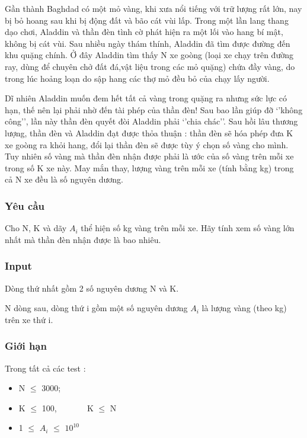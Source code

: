 

Gần thành Baghdad có một mỏ vàng, khi xưa nổi tiếng với trữ lượng rất lớn, nay bị bỏ hoang sau khi bị động đất và bão cát vùi lấp. Trong một lần lang thang dạo chơi, Aladdin và thần đèn tình cờ phát hiện ra một lối vào hang bí mật, không bị cát vùi. Sau nhiều ngày thám thính, Aladdin đã tìm được đường đến khu quặng chính. Ở đây Aladdin tìm thấy N xe goòng (loại xe chạy trên đường ray, dùng để chuyên chở đất đá,vật liệu trong các mỏ quặng) chứa đầy vàng, do trong lúc hoảng loạn do sập hang các thợ mỏ đều bỏ của chạy lấy người.

Dĩ nhiên Aladdin muốn đem hết tất cả vàng trong quặng ra nhưng sức lực có hạn, thế nên lại phải nhờ đến tài phép của thần đèn! Sau bao lần giúp đỡ ‘’không công’’, lần này thần đèn quyết đòi Aladdin phải ‘’chia chác’’. Sau hồi lâu thương lượng, thần đèn và Aladdin đạt được thỏa thuận : thần đèn sẽ hóa phép đưa K xe goòng ra khỏi hang, đổi lại thần đèn sẽ được tùy ý chọn số vàng cho mình. Tuy nhiên số vàng mà thần đèn nhận được phải là ước của số vàng trên mỗi xe trong số K xe này. May mắn thay, lượng vàng trên mỗi xe (tính bằng kg) trong cả N xe đều là số nguyên dương.

\subsubsection{Yêu cầu}

Cho N, K và dãy $A_{i}$ thể hiện số kg vàng trên mỗi xe. Hãy tính xem số vàng lớn nhất mà thần đèn nhận được là bao nhiêu.

\subsubsection{Input}

Dòng thứ nhất gồm 2 số nguyên dương N và K.

N dòng sau, dòng thứ i gồm một số nguyên dương $A_{i}$ là lượng vàng (theo kg) trên xe thứ i.

\subsubsection{Giới hạn}

Trong tất cả các test :
\begin{itemize}
	\item N  $\le$  3000;
	\item K  $\le$  100,        K  $\le$  N
	\item 1  $\le$  $A_{i}$  $\le$  $10^{10}$
\end{itemize}

